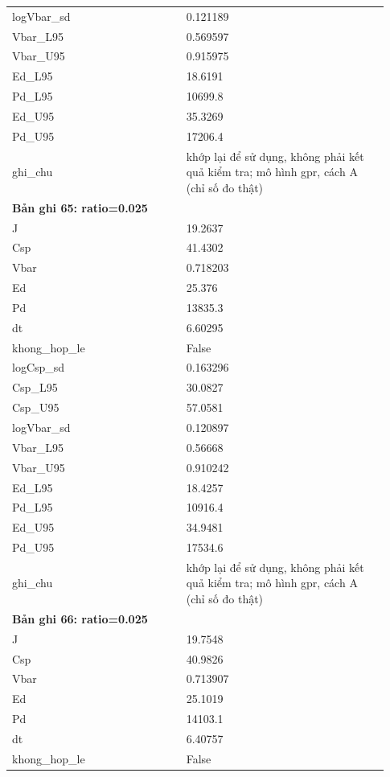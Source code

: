 \begin{longtable}{p{0.43\linewidth}p{0.50\linewidth}}
logVbar\_\allowbreak sd & 0.121189 \\
Vbar\_\allowbreak L95 & 0.569597 \\
Vbar\_\allowbreak U95 & 0.915975 \\
Ed\_\allowbreak L95 & 18.6191 \\
Pd\_\allowbreak L95 & 10699.8 \\
Ed\_\allowbreak U95 & 35.3269 \\
Pd\_\allowbreak U95 & 17206.4 \\
ghi\_\allowbreak chu & khớp lại để sử dụng, không phải kết quả kiểm tra; mô hình gpr, cách A (chỉ số đo thật) \\
\midrule
\multicolumn{2}{p{0.95\linewidth}}{\textbf{Bản ghi 65: ratio=0.025}} \\
J & 19.2637 \\
Csp & 41.4302 \\
Vbar & 0.718203 \\
Ed & 25.376 \\
Pd & 13835.3 \\
dt & 6.60295 \\
khong\_\allowbreak hop\_\allowbreak le & False \\
logCsp\_\allowbreak sd & 0.163296 \\
Csp\_\allowbreak L95 & 30.0827 \\
Csp\_\allowbreak U95 & 57.0581 \\
logVbar\_\allowbreak sd & 0.120897 \\
Vbar\_\allowbreak L95 & 0.56668 \\
Vbar\_\allowbreak U95 & 0.910242 \\
Ed\_\allowbreak L95 & 18.4257 \\
Pd\_\allowbreak L95 & 10916.4 \\
Ed\_\allowbreak U95 & 34.9481 \\
Pd\_\allowbreak U95 & 17534.6 \\
ghi\_\allowbreak chu & khớp lại để sử dụng, không phải kết quả kiểm tra; mô hình gpr, cách A (chỉ số đo thật) \\
\midrule
\multicolumn{2}{p{0.95\linewidth}}{\textbf{Bản ghi 66: ratio=0.025}} \\
J & 19.7548 \\
Csp & 40.9826 \\
Vbar & 0.713907 \\
Ed & 25.1019 \\
Pd & 14103.1 \\
dt & 6.40757 \\
khong\_\allowbreak hop\_\allowbreak le & False \\

\end{longtable}
